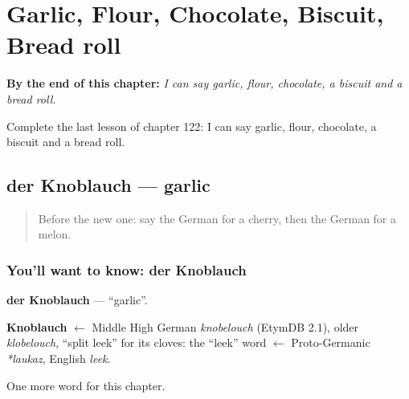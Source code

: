 
\chapter{Garlic, Flour, Chocolate, Biscuit, Bread roll}
\label{ch:ge-garlic-flour-chocolate-biscuit-bread-roll}

\begin{chapteropening}
\textbf{By the end of this chapter:} \emph{I can say garlic, flour, chocolate, a biscuit and a bread roll.}

Complete the last lesson of chapter 122: I can say garlic, flour, chocolate, a biscuit and a bread roll.
\end{chapteropening}

\section[der Knoblauch]{der Knoblauch — garlic}

\label{lesson:GE-C122-knoblauch}



\begin{quote}
Before the new one: say the German for a cherry, then the German for a melon.
\end{quote}

\subsection*{You'll want to know: der Knoblauch}
\textbf{der Knoblauch} — \textquotedblleft{}garlic\textquotedblright{}.

\begin{cousinweb}
\textbf{Knoblauch} $\leftarrow$ Middle High German \emph{knobelouch} (EtymDB 2.1), older \emph{klobelouch}, \textquotedblleft{}split leek\textquotedblright{} for its cloves: the \textquotedblleft{}leek\textquotedblright{} word $\leftarrow$ Proto-Germanic \emph{*laukaz}, English \emph{leek}.
\end{cousinweb}

\begin{grammarlens}[title={What you've built}]
One more word for this chapter.
\end{grammarlens}

